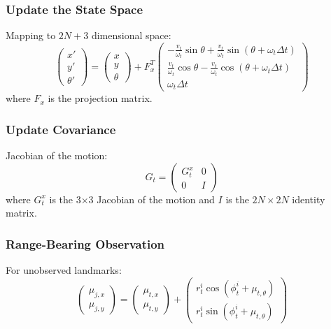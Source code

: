 \begin{frame}
    \frametitle{Update the State Space}

    Mapping to $2N+3$ dimensional space:
    \[
    \begin{pmatrix}
    x' \\
    y' \\
    \theta'
    \end{pmatrix}
    =
    \begin{pmatrix}
    x \\
    y \\
    \theta
    \end{pmatrix}
    +
    F_x^T
    \begin{pmatrix}
    -\frac{v_t}{\omega_t} \sin \theta + \frac{v_t}{\omega_t} \sin (\theta + \omega_t \Delta t) \\
    \frac{v_t}{\omega_t} \cos \theta - \frac{v_t}{\omega_t} \cos (\theta + \omega_t \Delta t) \\
    \omega_t \Delta t
    \end{pmatrix}
    \]
    where $F_x$ is the projection matrix.
\end{frame}

\begin{frame}
    \frametitle{Update Covariance}

    Jacobian of the motion:
    \[
    G_t = 
    \begin{pmatrix}
    G_t^x & 0 \\
    0 & I
    \end{pmatrix}
    \]
    where $G_t^x$ is the 3×3 Jacobian of the motion and $I$ is the $2N \times 2N$ identity matrix.
\end{frame}

\begin{frame}
    \frametitle{Range-Bearing Observation}

    For unobserved landmarks:
    \[
    \begin{pmatrix} 
    \mu_{j,x} \\ 
    \mu_{j,y} 
    \end{pmatrix} = 
    \begin{pmatrix} 
    \mu_{t,x} \\ 
    \mu_{t,y} 
    \end{pmatrix} + 
    \begin{pmatrix} 
    r_t^i \cos(\phi_t^i + \mu_{t,\theta}) \\ 
    r_t^i \sin(\phi_t^i + \mu_{t,\theta}) 
    \end{pmatrix}
    \]
\end{frame}

